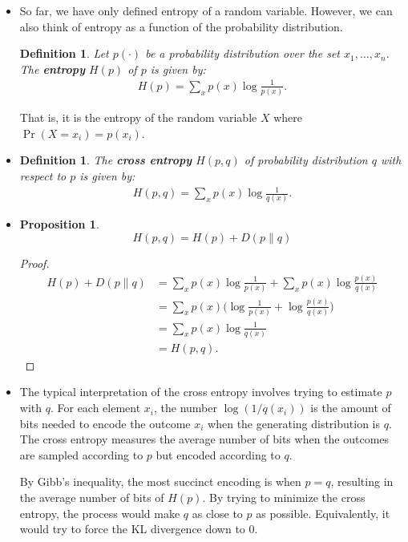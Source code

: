 \documentclass[10pt]{article}
\newtheorem{definition}[lemma]{Definition}
\newtheorem{proposition}[lemma]{Proposition}
\begin{document}
  \begin{itemize}
  	\item So far, we have only defined entropy of a random variable. However, we can also think of entropy as a function of the probability distribution.

  	\begin{definition}
  		Let $p(\cdot)$ be a probability distribution over the set ${x_1, \dotsc, x_n}$. The \textbf{entropy} $H(p)$ of $p$ is given by:
  		\begin{align*}
  			H(p) = \sum_{x} p(x) \log \frac{1}{p(x)}.
  		\end{align*}
  	\end{definition}

  	That is, it is the entropy of the random variable $X$ where $\Pr(X = x_i) = p(x_i)$.

  	\item \begin{definition}
  		The \textbf{cross entropy} $H(p,q)$ of probability distribution $q$ with respect to $p$ is given by:
  		\begin{align*}
  			H(p,q) = \sum_{x} p(x) \log \frac{1}{q(x)}.
  		\end{align*}
  	\end{definition}

  	\item \begin{proposition}
  		$$H(p,q) = H(p) + D(p\|q)$$
  	\end{proposition}
  	\begin{proof}
  		\begin{align*}
  			H(p) + D(p\|q)
  			&= \sum_{x} p(x) \log \frac{1}{p(x)}
  			   + \sum_{x} p(x) \log \frac{p(x)}{q(x)} \\
  			&= \sum_{x} p(x) \bigg( \log \frac{1}{p(x)}
  			   + \log \frac{p(x)}{q(x)} \bigg)\\
			&= \sum_{x} p(x) \log \frac{1}{q(x)} \\
			&= H(p,q).
  		\end{align*}
  	\end{proof}

  	\item The typical interpretation of the cross entropy involves trying to estimate $p$ with $q$. For each element $x_i$, the number $\log(1/q(x_i))$ is the amount of bits needed to encode the outcome $x_i$ when the generating distribution is $q$. The cross entropy measures the average number of bits when the outcomes are sampled according to $p$ but encoded according to $q$.

  	By Gibb's inequality, the most succinct encoding is when $p = q$, resulting in the average number of bits of $H(p)$. By trying to minimize the cross entropy, the process would make $q$ as close to $p$ as possible. Equivalently, it would try to force the KL divergence down to $0$.
  \end{itemize}

  
    
\end{document}
